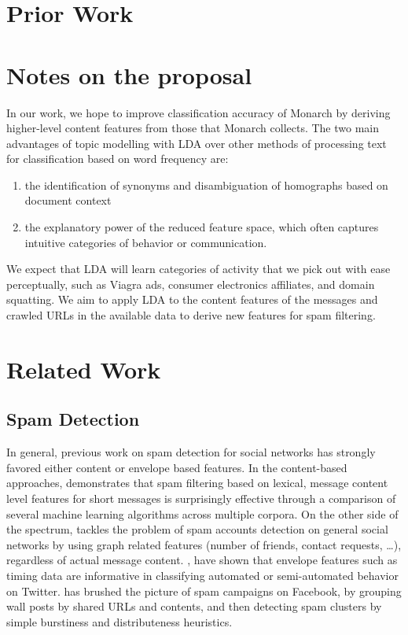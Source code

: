 \documentclass[times, 11pt, twocolumn]{article}
\begin{document}
\section{Prior Work}

\section{Notes on the proposal}
In our work, we hope to improve classification accuracy of Monarch by deriving higher-level content features from those that Monarch collects. The two main advantages of topic modelling with LDA over other methods of processing text for classification based on word frequency are:
\begin{enumerate}
\item the identification of synonyms and disambiguation of homographs based on document context
\item the explanatory power of the reduced feature space, which often captures intuitive categories of behavior or communication. 
\end{enumerate}
We expect that LDA will learn categories of activity that we pick out with ease perceptually, such as Viagra ads, consumer electronics affiliates, and domain squatting.
We aim to apply LDA to the content features of the messages and crawled URLs in the available data to derive new features for spam filtering. 

\section{Related Work}
\subsection{Spam Detection}
In general, previous work on spam detection for social networks has strongly favored either content or envelope based features. In the content-based approaches, \cite{Cormack2007} demonstrates that spam filtering based on lexical, message content level features for short messages is surprisingly effective through a comparison of several machine learning algorithms across multiple corpora. On the other side of the spectrum, \cite{Stringhini2010} tackles the problem of spam accounts detection on general social networks by using graph related features (number of friends, contact requests, \dots), regardless of actual message content. \cite{Zhang2011}, \cite{Ghosh2011} have shown that envelope features such as timing data are informative in classifying automated or semi-automated behavior on Twitter. \cite{Gao2010} has brushed the picture of spam campaigns on Facebook, by grouping wall posts by shared URLs and contents, and then detecting spam clusters by simple burstiness and distributeness heuristics.
\end{document}
